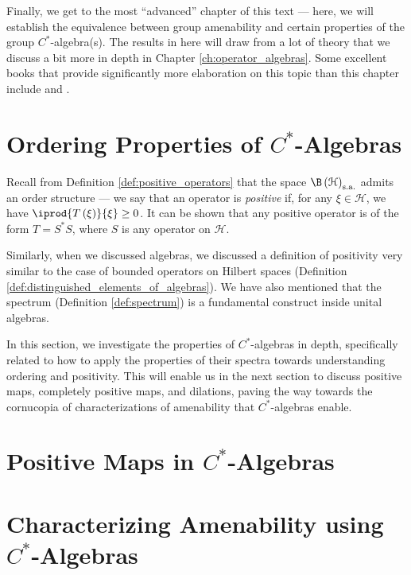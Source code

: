Finally, we get to the most ``advanced'' chapter of this text --- here, we will establish the equivalence between group amenability and certain properties of the group $C^{\ast}$-algebra(s). The results in here will draw from a lot of theory that we discuss a bit more in depth in Chapter \ref{ch:operator_algebras}. Some excellent books that provide significantly more elaboration on this topic than this chapter include \cite{brown_and_ozawa} and \cite{completely_bounded_maps_and_operator_algebras}.
\section{Ordering Properties of $C^{\ast}$-Algebras}%
Recall from Definition \ref{def:positive_operators} that the space $\B\left( \mathcal{H} \right)_{\sa}$ admits an order structure --- we say that an operator is \textit{positive} if, for any $\xi\in \mathcal{H}$, we have $ \iprod{T\left( \xi \right)}{\xi} \geq 0 $. It can be shown that any positive operator is of the form $T = S^{\ast}S$, where $S$ is any operator on $\mathcal{H}$.\newline

Similarly, when we discussed algebras, we discussed a definition of positivity very similar to the case of bounded operators on Hilbert spaces (Definition \ref{def:distinguished_elements_of_algebras}). We have also mentioned that the spectrum (Definition \ref{def:spectrum}) is a fundamental construct inside unital algebras.\newline

In this section, we investigate the properties of $C^{\ast}$-algebras in depth, specifically related to how to apply the properties of their spectra towards understanding ordering and positivity. This will enable us in the next section to discuss positive maps, completely positive maps, and dilations, paving the way towards the cornucopia of characterizations of amenability that $C^{\ast}$-algebras enable.
\section{Positive Maps in \texorpdfstring{$C^{\ast}$-Algebras}{C*-Algebras}}%

\section{Characterizing Amenability using \texorpdfstring{$C^{\ast}$-Algebras}{C*-Algebras}}%
